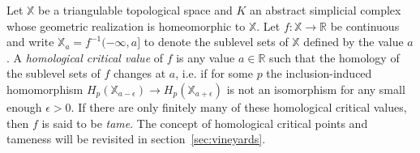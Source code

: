 \documentclass[sn-mathphys]{sn-jnl}
\newtheorem{definition}{Definition}
\begin{document}

Let $\mathbb{X}$ be a triangulable topological space and $K$ an abstract simplicial complex whose geometric realization is homeomorphic to $\mathbb{X}$. 
Let  $f: \mathbb{X} \to \mathbb{R}$ be continuous and  write $\mathbb{X}_a = f^{-1}(-\infty, a]$ to denote the sublevel sets of $\mathbb{X}$ defined by the value $a$. 
A \emph{homological critical value} of $f$ is any value $a \in \mathbb{R}$ such that the homology of the sublevel sets of $f$ changes at $a$, i.e.  if for some $p$ the inclusion-induced homomorphism  $H_p(\mathbb{X}_{a - \epsilon}) \to H_p(\mathbb{X}_{a+\epsilon})$ is not an isomorphism for any small enough $\epsilon >0$. If there are only finitely many of these homological critical values, then $f$ is said to be \emph{tame}. The concept of homological critical points and tameness will be revisited in section~\ref{sec:vineyards}.


\end{document}
